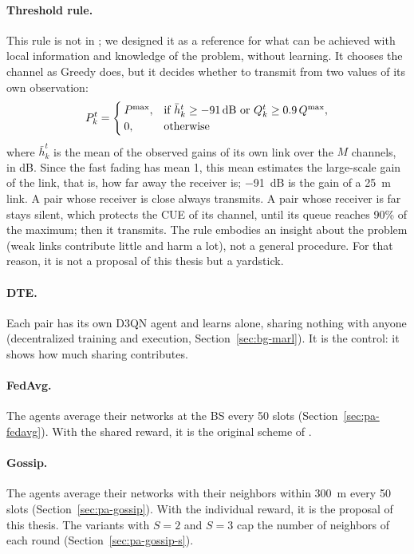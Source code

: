 \paragraph{Threshold rule.} This rule is not in \citet{li+22fedmarl}; we designed it as a reference for what
can be achieved with local information and knowledge of the problem, without learning. It chooses the channel
as Greedy does, but it decides whether to transmit from two values of its own observation:
\begin{equation}
  P_k^t =
  \begin{cases}
    P^{\mathrm{max}}, & \text{if } \bar h_k^t \ge \SI{-91}{dB} \text{ or } Q_k^t \ge 0.9\, Q^{\mathrm{max}} , \\
    0, & \text{otherwise}
  \end{cases}
  \label{eq:exp-threshold}
\end{equation}
where $\bar h_k^t$ is the mean of the observed gains of its own link over the $M$ channels, in dB. Since the
fast fading has mean 1, this mean estimates the large-scale gain of the link, that is, how far away the
receiver is; \SI{-91}{dB} is the gain of a \SI{25}{\meter} link. A pair whose receiver is close always
transmits. A pair whose receiver is far stays silent, which protects the \ac{CUE} of its channel, until its
queue reaches 90\% of the maximum; then it transmits. The rule embodies an insight about the problem (weak
links contribute little and harm a lot), not a general procedure. For that reason, it is not a proposal of
this thesis but a yardstick.

\paragraph{DTE.} Each pair has its own \ac{D3QN} agent and learns alone, sharing nothing with anyone
(decentralized training and execution, Section~\ref{sec:bg-marl}). It is the control: it shows how much
sharing contributes.

\paragraph{FedAvg.} The agents average their networks at the \ac{BS} every 50 slots
(Section~\ref{sec:pa-fedavg}). With the shared reward, it is the original scheme of \citet{li+22fedmarl}.

\paragraph{Gossip.} The agents average their networks with their neighbors within \SI{300}{\meter} every 50
slots (Section~\ref{sec:pa-gossip}). With the individual reward, it is the proposal of this thesis. The
variants with $S = 2$ and $S = 3$ cap the number of neighbors of each round (Section~\ref{sec:pa-gossip-s}).

